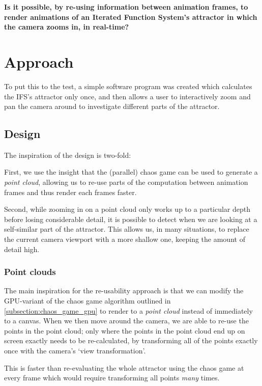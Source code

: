 \documentclass[11pt]{article}
\begin{document}
\textbf{\textbf{Is it possible, by re-using information between animation frames, 
to render animations of an Iterated Function System's attractor in which the camera zooms in, in real-time?}}

\section{Approach}
\label{sec:orgebdc313}
\label{section:approach}

To put this to the test, a simple software program was created which calculates the IFS's attractor only once,
and then allows a user to interactively zoom and pan the camera around to investigate different parts of the attractor.

\subsection{Design}
\label{sec:orgf748eb7}

The inspiration of the design is two-fold:

First, we use the insight that the (parallel) chaos game can be used to generate a \emph{point cloud}, allowing us to re-use parts of the computation between animation frames
and thus render each frames faster.

Second, while zooming in on a point cloud only works up to a particular depth before losing considerable detail, 
it is possible to detect when we are looking at a self-similar part of the attractor.
This allows us, in many situations, to replace the current camera viewport with a more shallow one, 
keeping the amount of detail high.

\subsubsection{Point clouds}
\label{sec:org0ba52fc}

The main inspiration for the re-usability approach is that we can modify the GPU-variant of the chaos game algorithm outlined in \autoref{subsection:chaos_game_gpu}
to render to a \emph{point cloud} instead of immediately to a canvas.
When we then move around the camera, we are able to re-use the points in the point cloud;
only where the points in the point cloud end up on screen exactly needs to be re-calculated, 
by transforming all of the points exactly once with the camera's `view transformation'.

This is faster than re-evaluating the whole attractor using the chaos game at every frame which would require transforming all points \emph{many} times.
\end{document}

